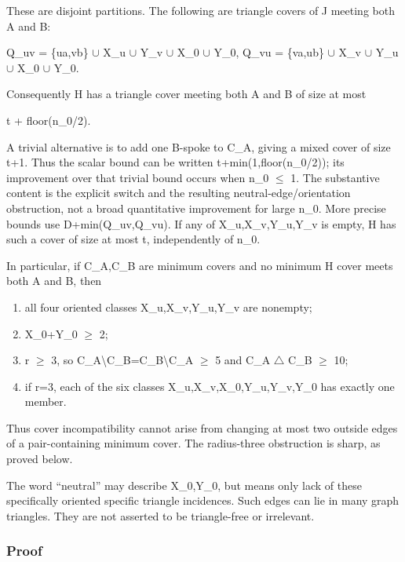 \documentclass[11pt]{article}
\providecommand{\tightlist}{\setlength{\itemsep}{0pt}\setlength{\parskip}{0pt}}
\begin{document}
These are disjoint partitions. The following are triangle covers of J meeting both A and B:

Q\_uv = \{ua,vb\} \(\cup\) X\_u \(\cup\) Y\_v \(\cup\) X\_0 \(\cup\) Y\_0, Q\_vu = \{va,ub\} \(\cup\) X\_v \(\cup\) Y\_u \(\cup\) X\_0 \(\cup\) Y\_0.

Consequently H has a triangle cover meeting both A and B of size at most

t + floor(n\_0/2).

A trivial alternative is to add one B-spoke to C\_A, giving a mixed cover of size t+1. Thus the scalar bound can be written t+min(1,floor(n\_0/2)); its improvement over that trivial bound occurs when n\_0 \(\le\) 1. The substantive content is the explicit switch and the resulting neutral-edge/orientation obstruction, not a broad quantitative improvement for large n\_0. More precise bounds use \textbar D\textbar+min(\textbar Q\_uv\textbar,\textbar Q\_vu\textbar). If any of X\_u,X\_v,Y\_u,Y\_v is empty, H has such a cover of size at most t, independently of n\_0.

In particular, if C\_A,C\_B are minimum covers and no minimum H cover meets both A and B, then

\begin{enumerate}
\def\labelenumi{\arabic{enumi}.}
\tightlist
\item
  all four oriented classes X\_u,X\_v,Y\_u,Y\_v are nonempty;
\item
  \textbar X\_0\textbar+\textbar Y\_0\textbar{} \(\ge\) 2;
\item
  r \(\ge\) 3, so \textbar C\_A\textbackslash C\_B\textbar=\textbar C\_B\textbackslash C\_A\textbar{} \(\ge\) 5 and \textbar C\_A \(\triangle\) C\_B\textbar{} \(\ge\) 10;
\item
  if r=3, each of the six classes X\_u,X\_v,X\_0,Y\_u,Y\_v,Y\_0 has exactly one member.
\end{enumerate}

Thus cover incompatibility cannot arise from changing at most two outside edges of a pair-containing minimum cover. The radius-three obstruction is sharp, as proved below.

The word ``neutral'' may describe X\_0,Y\_0, but means only lack of these specifically oriented specific triangle incidences. Such edges can lie in many graph triangles. They are not asserted to be triangle-free or irrelevant.

\subsubsection{Proof}\label{proof}
\end{document}

